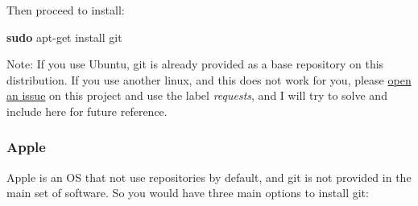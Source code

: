\documentclass[
]{book}
\newenvironment{Shaded}{\begin{snugshade}}{\end{snugshade}}
\newcommand{\FunctionTok}[1]{\textcolor[rgb]{0.13,0.29,0.53}{\textbf{#1}}}
\newcommand{\NormalTok}[1]{#1}
\begin{document}
Then proceed to install:

\begin{Shaded}
\begin{Highlighting}[]
\FunctionTok{sudo}\NormalTok{ apt{-}get install git}
\end{Highlighting}
\end{Shaded}

Note: If you use Ubuntu, git is already provided as a base repository on this
distribution. If you use another linux, and this does not work for you, please
\href{https://github.com/ricardobarroslourenco/CCprimer/issues}{open an issue} on
this project and use the label \emph{requests}, and I will try to solve and include
here for future reference.

\hypertarget{apple}{%
\subsubsection{Apple}\label{apple}}

Apple is an OS that not use repositories by default, and git is not provided in
the main set of software. So you would have three main options to install git:
\end{document}
